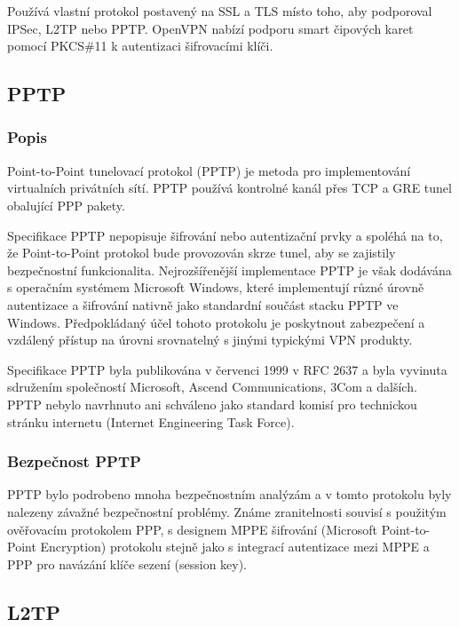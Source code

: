 \documentclass[thesis=B,czech]{FITthesis}[2012/06/26]
\begin{document}
		Používá vlastní protokol postavený na SSL a TLS místo toho, aby podporoval IPSec, L2TP nebo PPTP. OpenVPN nabízí podporu smart čipových karet pomocí PKCS\#11 k autentizaci šifrovacími klíči.

    \subsection{PPTP}

      \subsubsection{Popis}

		Point-to-Point tunelovací protokol (PPTP) je metoda pro implementování virtualních privátních sítí. PPTP používá kontrolné kanál přes TCP a GRE tunel obalující PPP pakety.

		Specifikace PPTP nepopisuje šifrování nebo autentizační prvky a spoléhá na to, že Point-to-Point protokol bude provozován skrze tunel, aby se zajistily bezpečnostní funkcionalita.
		Nejrozšířenější implementace PPTP je však dodávána s operačním systémem Microsoft Windows, které implementují různé úrovně autentizace a šifrování nativně jako standardní součást stacku PPTP ve Windows.
		Předpokládaný účel tohoto protokolu je poskytnout zabezpečení a vzdálený přístup na úrovni srovnatelný s jinými typickými VPN produkty.

		Specifikace PPTP byla publikována v červenci 1999 v RFC 2637\cite{pptp_basics} a byla vyvinuta sdružením společností Microsoft, Ascend Communications, 3Com a dalších. PPTP nebylo navrhnuto ani schváleno jako standard komisí pro technickou stránku internetu (Internet Engineering Task Force).

	  \subsubsection{Bezpečnost PPTP}

		PPTP bylo podrobeno mnoha bezpečnostním analýzám a v tomto protokolu byly nalezeny závažné bezpečnostní problémy.
		Známe zranitelnosti souvisí s použitým ověřovacím protokolem PPP, s designem MPPE šifrování (Microsoft Point-to-Point Encryption) protokolu stejně jako s integrací autentizace mezi MPPE a PPP pro navázání klíče sezení (session key).\cite{pptp_unsec_1}\cite{pptp_unsec_2}

    \subsection{L2TP}
\end{document}
